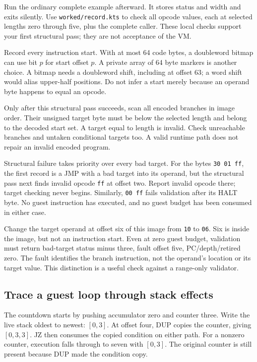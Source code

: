 Run the ordinary complete example afterward. It stores status and width and
exits silently. Use \texttt{worked/record.kts} to check all opcode values, each at
selected lengths zero through five, plus the complete caller. These local checks support your
first structural pass; they are not acceptance of the VM.

Record every instruction start. With at most 64 code bytes, a doubleword bitmap
can use bit $p$ for start offset $p$. A private array of 64 byte markers is
another choice. A bitmap needs a doubleword shift, including at offset 63;
a word shift would alias upper-half positions. Do not infer a start merely
because an operand byte happens to equal an opcode.

Only after this structural pass succeeds, scan all encoded branches in image
order. Their unsigned target byte must be below the selected length and belong
to the decoded start set. A target equal to length is invalid. Check unreachable
branches and untaken conditional targets too. A valid runtime path does not
repair an invalid encoded program.

Structural failure takes priority over every bad target. For the bytes
\texttt{30 01 ff}, the first record is a JMP with a bad target into its operand,
but the structural pass next finds invalid opcode \texttt{ff} at offset two.
Report invalid opcode there; target checking never begins. Similarly,
\texttt{00 ff} fails validation after its HALT byte. No guest instruction has
executed, and no guest budget has been consumed in either case.



Change the target operand at offset six of this image from \texttt{10} to
\texttt{06}. Six is inside the image, but not an instruction start. Even at
zero guest budget, validation must return bad-target status minus three, fault
offset five, PC/depth/retired zero. The fault identifies the branch instruction,
not the operand's location or its target value. This distinction is a useful
check against a range-only validator.



\subsection*{Trace a guest loop through stack effects}

The countdown starts by pushing accumulator zero and counter three. Write the
live stack oldest to newest: \([0,3]\). At offset four, DUP copies the counter,
giving \([0,3,3]\). JZ then consumes the copied condition on either path.
For a nonzero counter, execution falls through to seven with \([0,3]\).
The original counter is still present because DUP made the condition copy.

